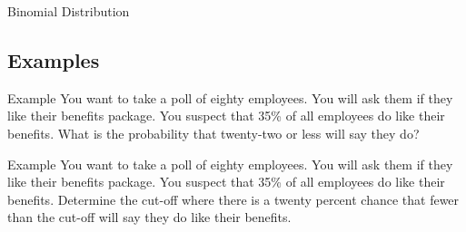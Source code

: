 \begin{frame}{Binomial Distribution}

  
\end{frame}

\subsection{Examples}

\begin{frame}{Example}
  You want to take a poll of eighty employees. You will ask them if
  they like their benefits package. You suspect that 35\% of all
  employees do like their benefits. What is the probability that
  twenty-two or less will say they do?

  \vfill
\end{frame}


\begin{frame}{Example}
  You want to take a poll of eighty employees. You will ask them if
  they like their benefits package. You suspect that 35\% of all
  employees do like their benefits. Determine the cut-off where there
  is a twenty percent chance that fewer than the cut-off will say
  they do like their benefits.

  \vfill
\end{frame}


